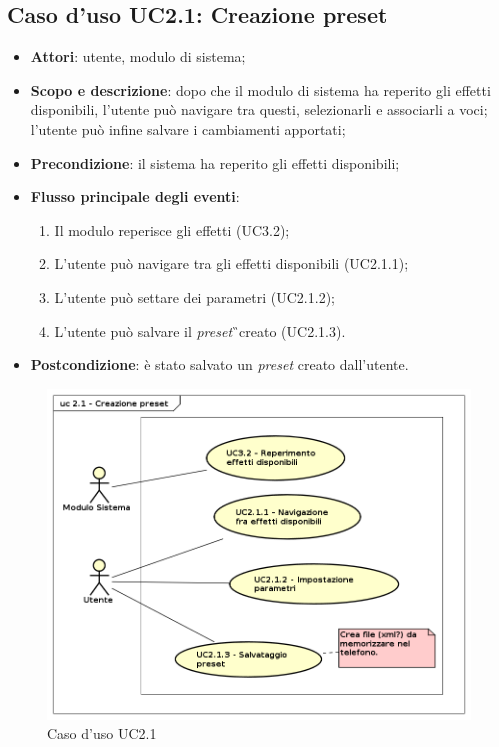 \subsection{Caso d'uso UC2.1: Creazione preset}
\label{sec:UC2.1}

\begin{itemize}
\item \textbf{Attori}: utente, modulo di sistema;
\item \textbf{Scopo e descrizione}: dopo che il modulo di sistema ha reperito gli effetti disponibili, l'utente può navigare tra questi, selezionarli e associarli a voci; l'utente può infine salvare i cambiamenti apportati;
\item \textbf{Precondizione}: il sistema ha reperito gli effetti disponibili;
\item \textbf{Flusso principale degli eventi}:
\begin{enumerate}
\item Il modulo reperisce gli effetti (UC3.2);
\item L'utente può navigare tra gli effetti disponibili (UC2.1.1);
\item L'utente può settare dei parametri (UC2.1.2);
\item L'utente può salvare il \textit{preset}\G\ creato (UC2.1.3).
\end{enumerate}
\item \textbf{Postcondizione}: è stato salvato un \textit{preset} creato dall'utente.
\end{itemize}
\begin{figure}[htbp]
\centering
\includegraphics[scale=0.5]{immagini/uc2_1_creazione_preset.png}
\captionsetup{labelfont=bf}
\caption{Caso d'uso UC2.1}
\end{figure}
\newpage

